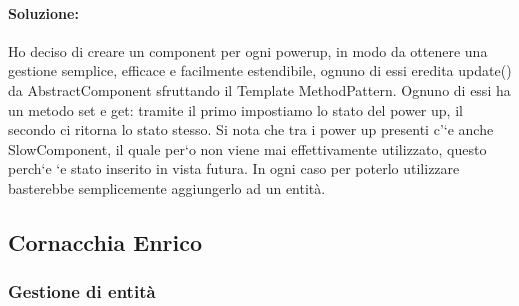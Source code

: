 \documentclass[a4paper,12pt]{report}
\begin{document}
\paragraph{Soluzione:}
Ho deciso di creare un component per ogni powerup, in modo da ottenere una gestione semplice, efficace e facilmente estendibile, ognuno di essi eredita update() da AbstractComponent sfruttando il Template MethodPattern. Ognuno di essi ha un metodo set e get: tramite il primo impostiamo lo stato del power up, il secondo ci ritorna lo stato stesso. Si nota che tra i power up presenti c’`e anche SlowComponent, il quale per`o non viene mai effettivamente utilizzato, questo perch`e `e stato inserito in vista futura. In ogni caso per poterlo utilizzare basterebbe semplicemente aggiungerlo ad un entità.


\subsection{Cornacchia Enrico}

\subsubsection{Gestione di entità}
\end{document}
